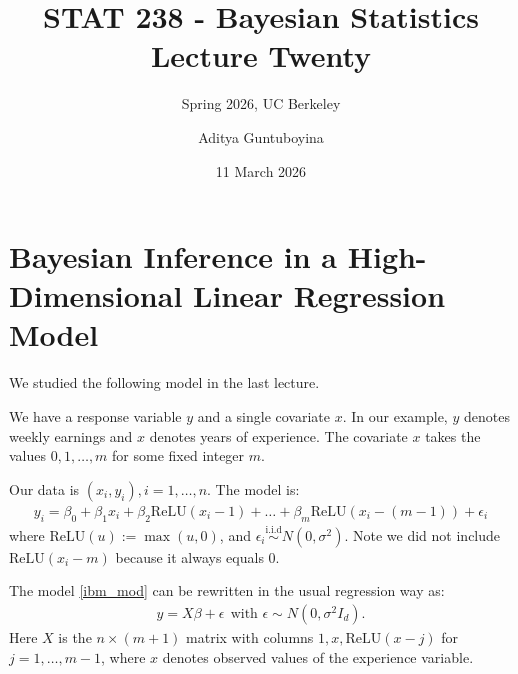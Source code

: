 \documentclass{scrartcl}
\newcommand{\relu}{{\text{ReLU}}}
\begin{document}
\title{STAT 238 - Bayesian Statistics  \\
  Lecture Twenty} 
\subtitle{Spring 2026, UC Berkeley}

\author{Aditya Guntuboyina}


\date{11 March 2026}

\maketitle

\section{Bayesian Inference in a High-Dimensional Linear Regression
  Model}

We studied the following model in the last lecture.

We have a response variable $y$ and a single covariate $x$. In our
example, $y$ denotes weekly earnings and $x$ denotes years of
experience. The covariate $x$ takes the values $0, 1, \dots, m$ for
some fixed integer $m$. 

Our data is $(x_i, y_i), i = 1, \dots, n$. The model is:
\begin{align}\label{ibm_mod}
  y_i = \beta_0 + \beta_1 x_i + \beta_2 \relu(x_i - 1) + \dots +
  \beta_{m}\relu(x_i - (m-1)) + \epsilon_i
\end{align}
where $\relu(u) := \max(u, 0)$, and $\epsilon_i
\overset{\text{i.i.d}}{\sim} N(0, \sigma^2)$. Note we did not include
$\relu(x_i - m)$ because it always equals 0.

The model \eqref{ibm_mod} can be rewritten in the usual regression way
as:
\begin{align*}
  y = X \beta + \epsilon ~~\text{with $\epsilon \sim N(0, \sigma^2
  I_d)$}. 
\end{align*}
Here $X$ is the $n \times (m+1)$ matrix with columns $1, x,
\relu(x-j)$ for $j = 1, \dots, m-1$, where $x$ denotes observed values
of the experience variable. 
\end{document}
